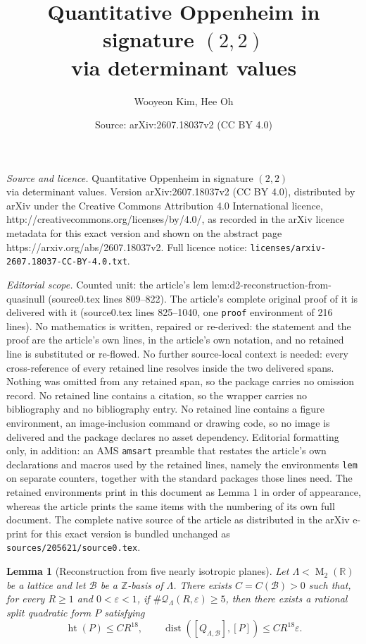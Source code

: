 \documentclass[10pt,a4paper]{amsart}
\title{Quantitative Oppenheim in signature $(2,2)$ \\ via determinant values}
\author{Wooyeon Kim, Hee Oh}
\date{Source: arXiv:2607.18037v2 (CC BY 4.0)}
\newtheorem{lem}{Lemma}
\newcommand{\M}{\operatorname{M}}
\begin{document}
\maketitle

\noindent\emph{Source and licence.} Quantitative Oppenheim in signature $(2,2)$ \\ via determinant values. Version arXiv:2607.18037v2 (CC BY 4.0), distributed by arXiv under the Creative Commons Attribution 4.0 International licence, http://creativecommons.org/licenses/by/4.0/, as recorded in the arXiv licence metadata for this exact version and shown on the abstract page https://arxiv.org/abs/2607.18037v2. Full licence notice: \texttt{licenses/arxiv-2607.18037-CC-BY-4.0.txt}.\par\smallskip

\noindent\textit{Editorial scope.} Counted unit: the article's lem lem:d2-reconstruction-from-quasinull (source0.tex lines 809--822). The article's complete original proof of it is delivered with it (source0.tex lines 825--1040, one \texttt{proof} environment of 216 lines). No mathematics is written, repaired or re-derived: the statement and the proof are the article's own lines, in the article's own notation, and no retained line is substituted or re-flowed.  No further source-local context is needed: every cross-reference of every retained line resolves inside the two delivered spans.  Nothing was omitted from any retained span, so the package carries no omission record.  No retained line contains a citation, so the wrapper carries no bibliography and no bibliography entry.  No retained line contains a figure environment, an image-inclusion command or drawing code, so no image is delivered and the package declares no asset dependency.  Editorial formatting only, in addition: an AMS \texttt{amsart} preamble that restates the article's own declarations and macros used by the retained lines, namely the environments \texttt{lem} on separate counters, together with the standard packages those lines need.  The retained environments print in this document as Lemma 1 in order of appearance, whereas the article prints the same items with the numbering of its own full document.  The complete native source of the article as distributed in the arXiv e-print for this exact version is bundled unchanged as \texttt{sources/205621/source0.tex}.
\begin{lem}[Reconstruction from five nearly isotropic planes]
\label{lem:d2-reconstruction-from-quasinull}
Let $\Lambda<\M_2(\mathbb R)$ be a lattice and let $\mathcal B$ be a
$\mathbb Z$-basis of $\Lambda$. There exists $C=C(\mathcal B)>0$ such
that, for every $R\ge1$ and $0<\varepsilon<1$, if
$\#\mathcal Q_\Lambda(R,\varepsilon)\ge5$, then there exists a rational
split quadratic form $P$ satisfying
\begin{equation}\label{eq:rational-split-reconstruction}
\operatorname{ht}(P)\le CR^{18},
\qquad
\operatorname{dist}([Q_{\Lambda,\mathcal B}],[P])
\le CR^{18}\varepsilon.
\end{equation}
\end{lem}
\end{document}
